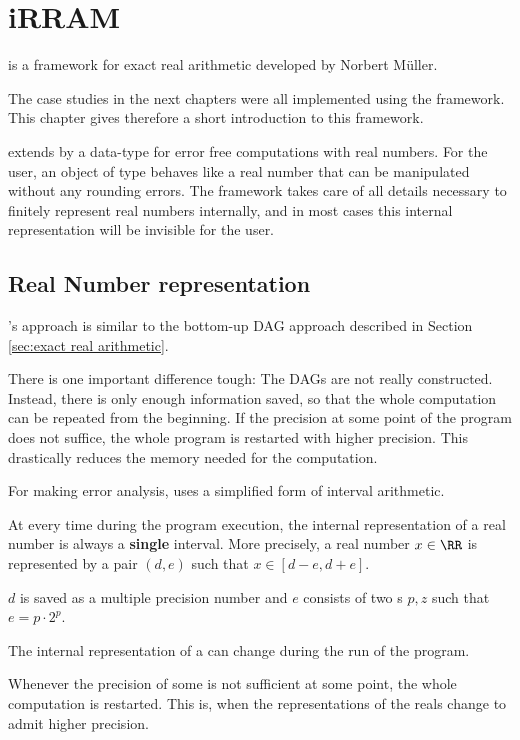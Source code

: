 \section{iRRAM}
	\irram is a \cc framework for exact real arithmetic developed by Norbert M\"uller.

  The case studies in the next chapters were all implemented using the \irram
  framework. 
  This chapter gives therefore a short introduction to this framework.

	\irram extends \cc by a data-type \real for error free computations with real numbers.
  For the user, an object of type \real behaves like a real number that can be
  manipulated without any rounding errors.
  The framework takes care of all details necessary to finitely represent real
  numbers internally, and in most cases this internal representation will be invisible for
  the user.
	\subsection{Real Number representation}
		{\irram}'s approach is similar to the bottom-up DAG approach described in
    Section \ref{sec:exact real arithmetic}.

		There is one important difference tough: The DAGs are not really
    constructed.
		Instead, there is only enough information saved, so that the whole
    computation can be repeated from the beginning.
    If the precision at some point of the program does not suffice, the whole
    program is restarted with higher precision. 
    This drastically reduces the memory needed for the computation.

    For making error analysis, \irram uses a simplified form of interval
    arithmetic.

		At every time during the program execution, the internal representation of
    a real number is always a \textbf{single} interval. 
    More precisely, a real number $x \in \RR$ is represented by a pair $(d,e)$ such that $x \in [d-e, d+e]$.

 		$d$ is saved as a multiple precision number and $e$ consists of two s $p,z$ such that $e = p \cdot 2^p$.

    The internal representation of a \real can change during the run of the
    program.
 		
 	  Whenever the precision of some \real is not sufficient at some point, the whole computation is restarted.
    This is, when the representations of the reals change to admit higher precision.

